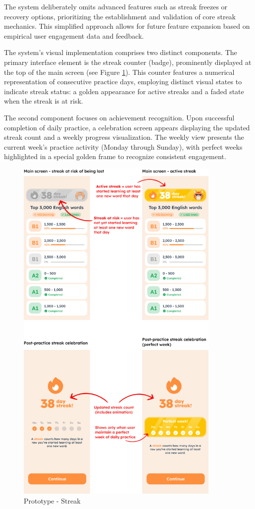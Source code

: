 The system deliberately omits advanced features such as streak freezes or recovery options, prioritizing the establishment and validation of core streak mechanics. This simplified approach allows for future feature expansion based on empirical user engagement data and feedback.

The system's visual implementation comprises two distinct components. The primary interface element is the streak counter (badge), prominently displayed at the top of the main screen (see Figure \ref{fig:em-prototype-streak}). This counter features a numerical representation of consecutive practice days, employing distinct visual states to indicate streak status: a golden appearance for active streaks and a faded state when the streak is at risk.

The second component focuses on achievement recognition. Upon successful completion of daily practice, a celebration screen appears displaying the updated streak count and a weekly progress visualization. The weekly view presents the current week's practice activity (Monday through Sunday), with perfect weeks highlighted in a special golden frame to recognize consistent engagement.

\begin{figure}[!h]
    \includegraphics[width=0.88\textwidth]{src/figures/em-prototype-streak.png}
    \caption{Prototype - Streak}
    \label{fig:em-prototype-streak}
\end{figure}